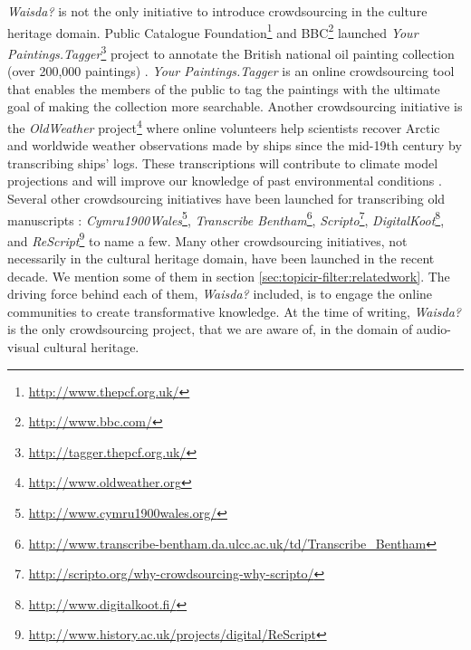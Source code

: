 \textit{Waisda?} is not the only initiative to introduce crowdsourcing in the culture heritage domain. Public Catalogue Foundation\footnote{\url{http://www.thepcf.org.uk/}} and BBC\footnote{\url{http://www.bbc.com/}} launched \textit{Your Paintings.Tagger}\footnote{\url{http://tagger.thepcf.org.uk/}} project to annotate the British national oil painting collection (over 200,000 paintings) \cite{ellis2012your}. \textit{Your Paintings.Tagger} is an online crowdsourcing tool that enables the members of the public to tag the paintings with the ultimate goal of making the collection more searchable. Another crowdsourcing initiative is the \textit{OldWeather} project\footnote{\url{http://www.oldweather.org}} where online volunteers help scientists recover Arctic and worldwide weather observations made by ships since the mid-19th century by transcribing ships' logs. These transcriptions will contribute to climate model projections and will improve our knowledge of past environmental conditions \cite{brohan2009marine}. Several other crowdsourcing initiatives have been launched for transcribing old manuscripts \cite{causer2014many,leon2014build,chrons2011digitalkoot}: \textit{Cymru1900Wales}\footnote{\url{http://www.cymru1900wales.org/}},  \textit{Transcribe Bentham}\footnote{\url{http://www.transcribe-bentham.da.ulcc.ac.uk/td/Transcribe_Bentham}}, \textit{Scripto}\footnote{\url{http://scripto.org/why-crowdsourcing-why-scripto/}}, \textit{DigitalKoot}\footnote{\url{http://www.digitalkoot.fi/}}, and \textit{ReScript}\footnote{\url{http://www.history.ac.uk/projects/digital/ReScript}} to name a few. Many other crowdsourcing initiatives, not necessarily in the cultural heritage domain, have been launched in the recent decade. We mention some of them in section \ref{sec:topicir-filter:relatedwork}. The driving force behind each of them, \textit{Waisda?} included, is to engage the online communities to create transformative knowledge. At the time of writing, \textit{Waisda?} is the only crowdsourcing project, that we are aware of, in the domain of audio-visual cultural heritage.




